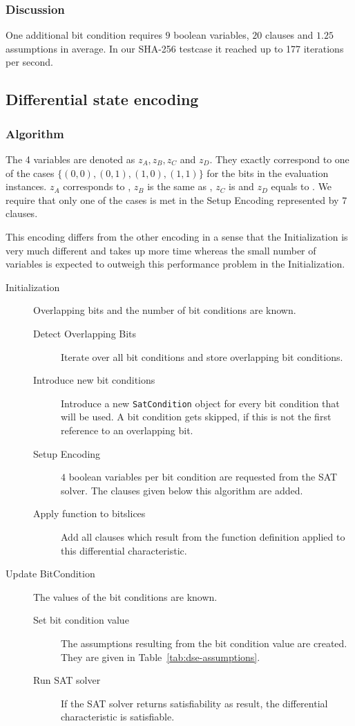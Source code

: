 \subsubsection{Discussion}
\label{sec:reduced-encoding-discussion}
%
One additional bit condition requires $9$ boolean variables, $20$ clauses and $1.25$ assumptions in average.
In our SHA-256 testcase it reached up to 177 iterations per second.

\subsection{Differential state encoding}
\label{sec:encoding:dse}
%
\subsubsection{Algorithm}
\label{sec:encoding:dse-algorithm}
%
The 4 variables are denoted as $z_A, z_B, z_C$ and $z_D$. They exactly correspond to one of the cases $\{(0, 0), (0, 1), (1, 0), (1, 1)\}$ for the bits in the evaluation instances. $z_A$ corresponds to , $z_B$ is the same as , $z_C$ is  and $z_D$ equals to . We require that only one of the cases is met in the Setup Encoding represented by 7 clauses.

This encoding differs from the other encoding in a sense that the Initialization is very much different and takes up more time whereas the small number of variables is expected to outweigh this performance problem in the Initialization.
%
\begin{description}
  \item[Initialization] Overlapping bits and the number of bit conditions are known.
    \begin{description}
      \item[Detect Overlapping Bits] Iterate over all bit conditions and store overlapping bit conditions.
      \item[Introduce new bit conditions] Introduce a new \texttt{SatCondition} object for every bit condition that will be used. A bit condition gets skipped, if this is not the first reference to an overlapping bit.
      \item[Setup Encoding] $4$ boolean variables per bit condition are requested from the SAT solver. The clauses given below this algorithm are added.
      \item[Apply function to bitslices] Add all clauses which result from the function definition applied to this differential characteristic.
    \end{description}
  \item[Update BitCondition] The values of the bit conditions are known.
    \begin{description}
      \item[Set bit condition value] The assumptions resulting from the bit condition value are created. They are given in Table~\ref{tab:dse-assumptions}.
      \item[Run SAT solver] If the SAT solver returns satisfiability as result, the differential characteristic is satisfiable.
    \end{description}
\end{description}

